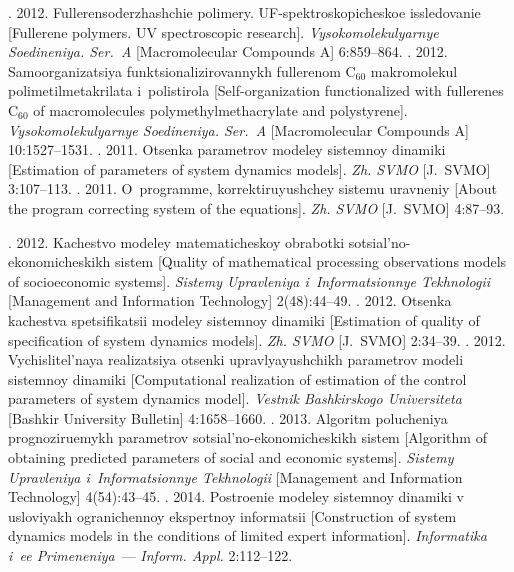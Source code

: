 \begin{multicols}{2}
{{\begin{thebibliography}{99}
. 2012. Fullerensoderzhashchie polimery.
UF-spektroskopicheskoe issledovanie [Fullerene polymers. UV spectroscopic
research]. \textit{Vysokomolekulyarnye Soedineniya. Ser.~A} [Macromolecular
Compounds A] 6:859--864.
. 2012.
Samoorganizatsiya funktsionalizirovannykh fullerenom C$_{60}$ makromolekul
polimetilmetakrilata i~polistirola [Self-organization functionalized with fullerenes
C$_{60}$ of macromolecules polymethylmethacrylate and polystyrene].
\textit{Vysokomolekulyarnye Soedineniya. Ser.~A} [Macromolecular Compounds
A] 10:1527--1531.
. 2011. Otsenka parametrov modeley
sistemnoy dinamiki [Estimation of parameters of system dynamics models].
\textit{Zh. SVMO} [J.~SVMO] 3:107--113.
. 2011. O~programme,
korrektiruyushchey sistemu uravneniy [About the program correcting system of the
equations]. \textit{Zh. SVMO} [J.~SVMO] 4:87--93.

. 2012. Kachestvo modeley matematicheskoy
obrabotki sotsial'no-ekonomicheskikh sistem [Quality of mathematical processing
observations models of socioeconomic systems]. \textit{Sistemy Upravleniya
i~Informatsionnye Tekhnologii} [Management and Information Technology]
2(48):44--49.
. 2012. Otsenka kachestva spetsifikatsii
modeley sistemnoy dinamiki [Estimation of quality of specification of system
dynamics models]. \textit{Zh. SVMO} [J.~SVMO] 2:34--39.
. 2012. Vychislitel'naya
realizatsiya otsenki upravlyayushchikh parametrov modeli sistemnoy dinamiki
[Computational realization of estimation of the control parameters of system
dynamics model]. \textit{Vestnik Bashkirskogo Universiteta} [Bashkir University
Bulletin] 4:1658--1660.
. 2013. Algoritm polucheniya
prognoziruemykh parametrov sotsial'no-ekonomicheskikh sistem [Algorithm of
obtaining predicted parameters of social and economic systems]. \textit{Sistemy
Upravleniya i~Informatsionnye Tekhnologii} [Management and Information
Technology] 4(54):43--45.
. 2014. Postroenie modeley sistemnoy
dinamiki v usloviyakh ogranichennoy ekspertnoy informatsii [Construction of system
dynamics models in the conditions of limited expert information]. \textit{Informatika
i~ee Primeneniya}~--- \textit{Inform. Appl.} 2:112--122.
\end{thebibliography}

 }
 }

\end{multicols}

